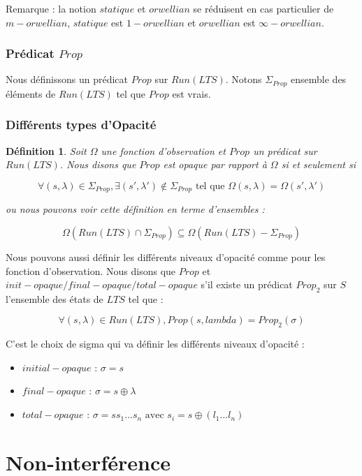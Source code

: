 \documentclass[10pt,a4paper]{article}
\newtheorem {mydef} {D\'efinition}
\begin{document}
	Remarque : la notion $statique$ et $orwellian$ se r\'eduisent en cas particulier de $m-orwellian$, $statique$ est $1-orwellian$ et $orwellian$ est $\infty-orwellian$.

\subsubsection{Pr\'edicat $Prop$}	
	Nous d\'efinissons un pr\'edicat $Prop$ sur $Run(LTS)$. Notons $\Sigma_{Prop}$ ensemble des \'el\'ements de $Run(LTS)$ tel que $Prop$ est vrais.
	
\subsubsection{Diff\'erents types d'Opacit\'e}

\begin{mydef}
	Soit $\Omega$ une fonction d'observation et $Prop$ un pr\'edicat sur $Run(LTS)$. Nous disons que $Prop$ est opaque par rapport \`a $\Omega$ si et seulement si
	
	$$\forall (s,\lambda) \in \Sigma_{Prop}, \exists (s',\lambda')\not\in \Sigma_{Prop} \mbox{ tel que } \Omega(s,\lambda) = \Omega (s',\lambda')$$
	
	ou nous pouvons voir cette d\'efinition en terme d'ensembles :
	
	$$\Omega(Run(LTS)\cap \Sigma_{Prop})\subseteq \Omega(Run(LTS)-\Sigma_{Prop})$$
\end{mydef}

Nous pouvons aussi d\'efinir les diff\'erents niveaux d'opacit\'e comme pour les fonction d'observation. Nous disons que $Prop$ et $init-opaque/final-opaque/total-opaque$ s'il existe un pr\'edicat $Prop_2$ sur $S$ l'ensemble des \'etats de $LTS$ tel que :

$$\forall (s,\lambda) \in Run(LTS), Prop(s,lambda) = Prop_2(\sigma)$$

C'est le choix de sigma qui va d\'efinir les diff\'erents niveaux d'opacit\'e :

\begin{itemize}
	\item $initial-opaque$ : $\sigma = s$
	\item $final-opaque$ : $\sigma = s\oplus \lambda$
	\item $total-opaque$ : $\sigma = s s_1 \dots s_n \mbox{ avec } s_i = s\oplus(l_1\dots l_n)$
\end{itemize} 

\section{Non-interf\'erence}
\end{document}

